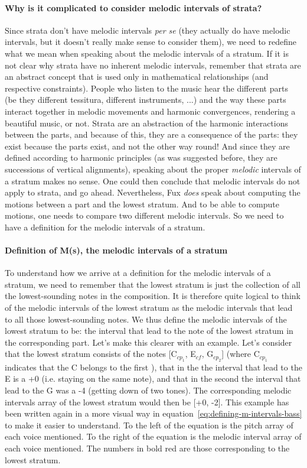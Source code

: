 \paragraph{Why is it complicated to consider melodic intervals of strata?}
Since strata don't have melodic intervals \textit{per se} (they actually do have melodic intervals, but it doesn't really make sense to consider them), we need to redefine what we mean when speaking about the melodic intervals of a stratum. If it is not clear why strata have no inherent melodic intervals, remember that strata are an abstract concept that is used only in mathematical relationships (and respective constraints). People who listen to the music hear the different parts (be they different tessitura, different instruments, ...) and the way these parts interact together in melodic movements and harmonic convergences, rendering a beautiful music, or not. Strata are an abstraction of the harmonic interactions between the parts, and because of this, they are a consequence of the parts: they exist because the parts exist, and not the other way round! And since they are defined according to harmonic principles (as was suggested before, they are successions of vertical alignments), speaking about the proper \textit{melodic} intervals of a stratum makes no sense. One could then conclude that melodic intervals do not apply to strata, and go ahead. Nevertheless, Fux \textit{does} speak about computing the motions between a part and the lowest stratum. And to be able to compute motions, one needs to compare two different melodic intervals. So we need to have a definition for the melodic intervals of a stratum. 

\paragraph{Definition of M(s), the melodic intervals of a stratum}
To understand how we arrive at a definition for the melodic intervals of a stratum, we need to remember that the lowest stratum is just the collection of all the lowest-sounding notes in the composition. It is therefore quite logical to think of the melodic intervals of the lowest stratum as the melodic intervals that lead to all those lowest-sounding notes. We thus define the melodic intervals of the lowest stratum to be: the interval that lead to the note of the lowest stratum in the corresponding part. Let's make this clearer with an example. Let's consider that the lowest stratum consists of the notes [C$_{cp_1}$, E$_{\mathit{cf}}$, G$_{cp_2}$] (where C$_{cp_1}$ indicates that the C belongs to the first \cp), that in the \cfs the interval that lead to the E is a +0 (i.e. staying on the same note), and that in the second \cps the interval that lead to the G was a -4 (getting down of two tones). The corresponding melodic intervals array of the lowest stratum would then be [+0, -2]. This example has been written again in a more visual way in equation~\ref{eq:defining-m-intervals-bass} to make it easier to understand. To the left of the equation is the pitch array of each voice mentioned. To the right of the equation is the melodic interval array of each voice mentioned. The numbers in bold red are those corresponding to the lowest stratum.


